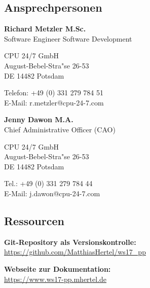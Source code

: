 \documentclass[12pt]{article}
\begin{document}
\subsection{Ansprechpersonen}

\textbf{Richard Metzler M.Sc.}\\
Software Engineer Software Development

CPU 24/7 GmbH \\
August-Bebel-Stra"se 26-53\\
DE 14482 Potsdam

Telefon: +49 (0) 331 279 784 51 \\
E-Mail: r.metzler@cpu-24-7.com

\textbf{Jenny Dawon M.A.}\\
Chief Administrative Officer (CAO)

CPU 24/7 GmbH\\
August-Bebel-Stra"se 26-53\\
DE 14482 Potsdam

Tel.: +49 (0) 331 279 784 44\\
E-Mail: j.dawon@cpu-24-7.com

\subsection{Ressourcen}
\textbf{Git-Repository als Versionskontrolle:}\\
\url{https://github.com/MatthiasHertel/ws17_pp}

\textbf{Webseite zur Dokumentation:}\\
\url{https://www.ws17-pp.mhertel.de}
\end{document}
